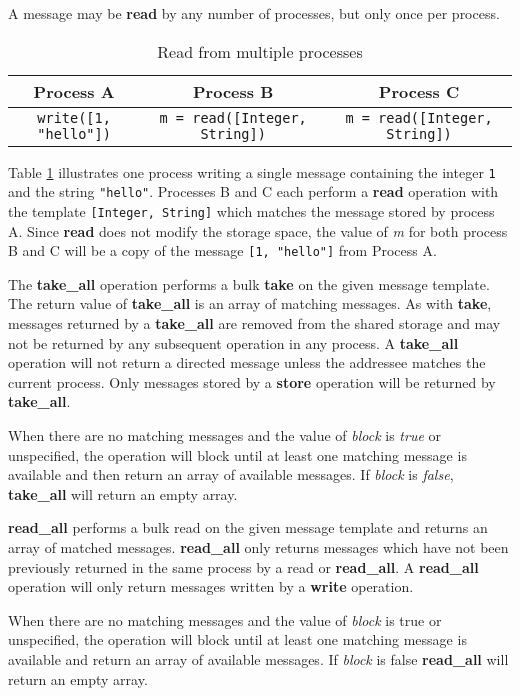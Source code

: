 A message may be \textbf{read} by any number of processes, but only once per process.

\begin{table}
\centering
\caption{Read from multiple processes}
\begin{tabular}{|c|c|c|} \hline
\textbf{Process A} & \textbf{Process B} & \textbf{Process C} \\ \hline
\texttt{write([1, "hello"])} & \texttt{m = read([Integer, String])} & \texttt{m = read([Integer, String])} \\ \hline
\end{tabular}
\label{fig:readprocesses}
\end{table}

Table \ref{fig:readprocesses} illustrates one process writing a single message containing the integer \texttt{1} and the string \texttt{"hello"}. Processes B and C each perform a \textbf{read} operation with the template \texttt{[Integer, String]} which matches the message stored by process A. Since \textbf{read} does not modify the storage space, the value of \textit{m} for both process B and C will be a copy of the message \texttt{[1, "hello"]} from Process A.

The \textbf{take\_all} operation performs a bulk \textbf{take} on the given message template. The return value of \textbf{take\_all} is an array of matching messages. As with \textbf{take}, messages returned by a \textbf{take\_all} are removed from the shared storage and may not be returned by any subsequent operation in any process. A \textbf{take\_all} operation will not return a directed message unless the addressee matches the current process. Only messages stored by a \textbf{store} operation will be returned by \textbf{take\_all}.

When there are no matching messages and the value of \textit{block} is \textit{true} or unspecified, the operation will block until at least one matching message is available and then return an array of available messages. If \textit{block} is \textit{false}, \textbf{take\_all} will return an empty array.

\textbf{read\_all} performs a bulk read on the given message template and returns an array of matched messages. \textbf{read\_all} only returns messages which have not been previously returned in the same process by a read or \textbf{read\_all}. A \textbf{read\_all} operation will only return messages written by a \textbf{write} operation.

When there are no matching messages and the value of \textit{block} is true or unspecified, the operation will block until at least one matching message is available and return an array of available messages. If \textit{block} is false \textbf{read\_all} will return an empty array.
